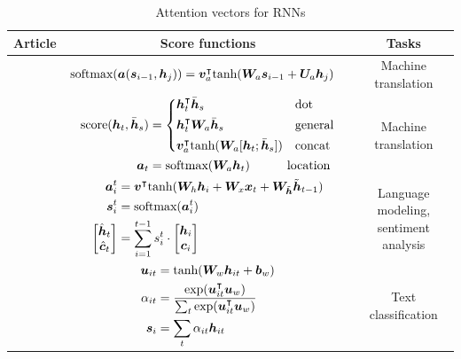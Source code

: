 \begin{longtable}{ccc}
    \caption{Attention vectors for RNNs} \\
    \hline
    \textbf{Article} & \textbf{Score functions} & \textbf{Tasks} \\
    \hline
    \endhead
    \cite{bahdanau2014neural} & $\begin{aligned} \text{softmax}( {\boldsymbol{a}}( {\boldsymbol{s}}_{i-1}, {\boldsymbol{h}}_j) ) &= {\boldsymbol{v}}_a^{\intercal} \text{tanh}( {\boldsymbol{W}}_a {\boldsymbol{s}}_{i-1} + {\boldsymbol{U}}_a {\boldsymbol{h}}_j) \end{aligned}$  & \makecell{Machine\\translation} \\ \hline
    \cite{luong2015effective} & $ \begin{aligned} \text{score}( {\boldsymbol{h}}_t, \bar{{\boldsymbol{h}}}_s) &= \left \{ \begin{aligned} &{\boldsymbol{h}}^{\intercal}_t \bar{{\boldsymbol{h}}}_s   &&\text{dot} \\  &{\boldsymbol{h}}^{\intercal}_t  {\boldsymbol{W}}_a \bar{{\boldsymbol{h}}}_s  &&\text{general} \\  &{\boldsymbol{v}}^{\intercal}_a \text{tanh} ( {\boldsymbol{W}}_a[ {\boldsymbol{h}}_t ; \bar{{\boldsymbol{h}}}_s ])  &&\text{concat}  \end{aligned}  \right.  \\  {\boldsymbol{a}}_t &= \text{softmax}( {\boldsymbol{W}}_a {\boldsymbol{h}}_t) \quad \quad \quad \text{location} \end{aligned} $ & \makecell{Machine\\translation} \\  \hline
    \cite{cheng2016long} & $\begin{aligned} {\boldsymbol{a}}^{t}_{i} &= {\boldsymbol{v}}^{\intercal} \text{tanh}( {\boldsymbol{W}}_h {\boldsymbol{h}}_i + {\boldsymbol{W}}_x {\boldsymbol{x}}_t + {\boldsymbol{W}}_{\tilde{{\boldsymbol{h}}}} \tilde{{\boldsymbol{h}}}_{t-1} ) \\ {\boldsymbol{s}}^t_i &= \text{softmax}( {\boldsymbol{a}}^t_i) \\ \begin{bmatrix} \hat{{\boldsymbol{h}}}_t  \\ \hat{{\boldsymbol{c}}}_t \end{bmatrix} &= \sum^{t-1}_{i=1} s^t_i \cdot \begin{bmatrix} {\boldsymbol{h}}_i \\ {\boldsymbol{c}}_i \end{bmatrix}   \end{aligned}$ & \makecell{Language modeling,\\sentiment analysis} \\   \hline
    \cite{yang2016hierarchical} & $\begin{aligned} {\boldsymbol{u}}_{it} &= \text{tanh}( {\boldsymbol{W}}_w {\boldsymbol{h}}_{it} + {\boldsymbol{b}}_w ) \\ \alpha_{it} &= \frac{\text{exp}({\boldsymbol{u}}_{it}^{\intercal} {\boldsymbol{u}}_w)}{ \sum_t \text{exp}( {\boldsymbol{u}}_{it}^{\intercal} {\boldsymbol{u}}_w ) } \\ {\boldsymbol{s}}_i &= \sum_t \alpha_{it} {\boldsymbol{h}}_{it} \end{aligned}$ & \makecell{Text\\classification} \\  \hline

\end{longtable}
